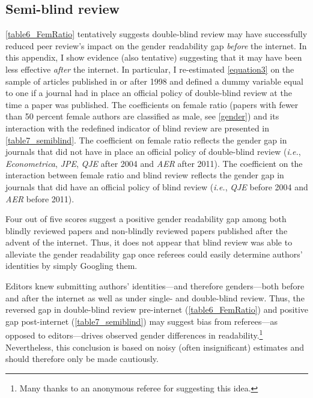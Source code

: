 \begin{appendices}
\begin{refsection}
\clearpage

\subsection{Semi-blind review}
\label{appendixdoubleblind}

\autoref{table6_FemRatio} tentatively suggests double-blind review may have successfully reduced peer review's impact on the gender readability gap \emph{before} the internet. In this appendix, I show evidence (also tentative) suggesting that it may have been less effective \emph{after} the internet. In particular, I re-estimated \autoref{equation3} on the sample of articles published in or after 1998 and defined a dummy variable equal to one if a journal had in place an official policy of double-blind review at the time a paper was published. The coefficients on female ratio (papers with fewer than 50 percent female authors are classified as male, see \autoref{gender}) and its interaction with the redefined indicator of blind review are presented in \autoref{table7_semiblind}. The coefficient on female ratio reflects the gender gap in journals that did not have in place an official policy of double-blind review (\emph{i.e.}, \emph{Econometrica}, \emph{JPE}, \emph{QJE} after 2004 and \emph{AER} after 2011). The coefficient on the interaction between female ratio and blind review reflects the gender gap in journals that did have an official policy of blind review (\emph{i.e.}, \emph{QJE} before 2004 and \emph{AER} before 2011).

Four out of five scores suggest a positive gender readability gap among both blindly reviewed papers and non-blindly reviewed papers published after the advent of the internet. Thus, it does not appear that blind review was able to alleviate the gender readability gap once referees could easily determine authors' identities by simply Googling them.

Editors knew submitting authors' identities---and therefore genders---both before and after the internet as well as under single- and double-blind review. Thus, the reversed gap in double-blind review pre-internet (\autoref{table6_FemRatio}) and positive gap post-internet (\autoref{table7_semiblind}) may suggest bias from referees---as opposed to editors---drives observed gender differences in readability.\footnote{Many thanks to an anonymous referee for suggesting this idea.} Nevertheless, this conclusion is based on noisy (often insignificant) estimates and should therefore only be made cautiously.



\end{refsection}
\end{appendices}

